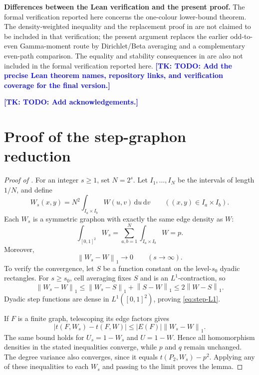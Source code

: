 \documentclass[11pt]{article}
\numberwithin{equation}{section}
\newcommand{\norm}[1]{\left\lVert #1\right\rVert}
\newcommand{\dd}{\,\mathrm d}
\newcommand*{\tk}[1]{\textcolor{blue}{\textbf{[TK: #1]}}}
\newcommand{\dens}[2]{t(#1,#2)}
\newcommand{\tP}[2]{t(P_{#1},#2)}
\begin{document}
\noindent\textbf{Differences between the Lean verification and the present proof.}
The formal verification reported here concerns the one-colour
lower-bound theorem. The density-weighted inequality and the
replacement proof in  are not claimed
to be included in that verification; the present argument replaces
the earlier odd-to-even Gamma-moment route by Dirichlet/Beta
averaging and a complementary even-path comparison. The equality
and stability consequences in  are also
not included in the formal verification reported here.
\tk{TODO: Add the precise Lean theorem names, repository links, and
verification coverage for the final version.}

\tk{TODO: Add acknowledgements.}




\appendix
{}

\section{Proof of the step-graphon reduction}
\label{app:step-reduction}

\begin{proof}[Proof of ]
  For an integer $s\ge1$, set $N=2^s$. Let $I_1,\ldots,I_N$ be the
  intervals of length $1/N$, and
  define
  \[
    W_s(x,y)=N^2\int_{I_a\times I_b}W(u,v)\dd u\dd v
    \qquad ((x,y)\in I_a\times I_b).
  \]
  Each $W_s$ is a symmetric graphon with exactly the same edge density as
  $W$:
  \[
    \int_{[0,1]^2}W_s
    =\sum_{a,b=1}^N\int_{I_a\times I_b}W=p.
  \]
  Moreover,
  \begin{equation}\label{eq:step-L1}
    \norm{W_s-W}_1\longrightarrow0
    \qquad(s\to\infty).
  \end{equation}
  To verify the convergence, let $S$ be a function constant on the
  level-$s_0$ dyadic rectangles. For $s\ge s_0$, cell averaging fixes
  $S$ and is an $L^1$-contraction, so
  \[
    \norm{W_s-W}_1
    \le \norm{W_s-S}_1+\norm{S-W}_1
    \le2\norm{W-S}_1.
  \]
  Dyadic step functions are dense in $L^1([0,1]^2)$, proving
  \eqref{eq:step-L1}.

  If $F$ is a finite graph, telescoping its edge factors gives
  \[
    \left|\dens F{W_s}-\dens FW\right|
    \le |E(F)|\norm{W_s-W}_1.
  \]
  The same bound holds for $U_s=1-W_s$ and $U=1-W$. Hence all
  homomorphism densities in the stated inequalities converge, while
  $p$ and $q$ remain unchanged. The degree variance also converges,
  since it equals $\tP2{W_s}-p^2$. Applying any of these inequalities
  to each $W_s$ and passing to the limit proves the lemma.
\end{proof}
\end{document}
